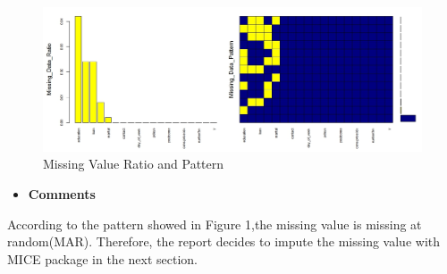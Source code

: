          \begin{figure}[htbp] 
         \centering
         \includegraphics[width=5.5in]{MVP.jpeg} 
         \caption{Missing Value Ratio and Pattern}\label{fig:1} 
        \end{figure}
         \begin{itemize}
         	\item \textbf{Comments}
         \end{itemize}
        \noindent According to the pattern showed in Figure 1,the missing value is missing at random(MAR). Therefore, the report decides to impute the missing value with MICE package in the next section.\\
